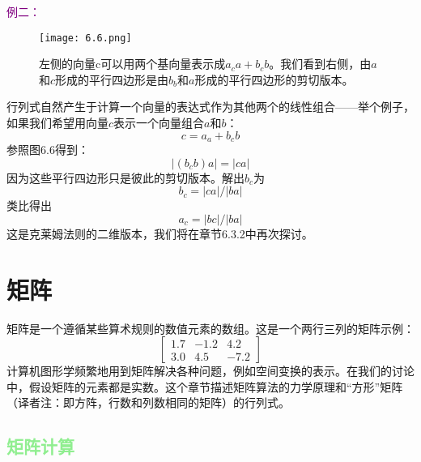 \documentclass[lang=cn,12pt,marginpar=margintrue]{elegantbook}
\begin{document}
\textcolor{purple}{例二：}

\begin{figure}[htbp]
  \centering
  \texttt{[image: 6.6.png]}
  \caption{左侧的向量c可以用两个基向量表示成$a_ca+b_cb$。我们看到右侧，由$a$和$c$形成的平行四边形是由$b_b$和$a$形成的平行四边形的剪切版本。}
\end{figure}

行列式自然产生于计算一个向量的表达式作为其他两个的线性组合——举个例子，如果我们希望用向量$c$表示一个向量组合$a$和$b$：
\[
  c = a_a + b_cb
\]
参照图6.6得到：
\[
  |(b_cb)a| = |ca|
\]
因为这些平行四边形只是彼此的剪切版本。解出$b_c$为
\[
  b_c = |ca|/|ba|
\]
类比得出
\[
  a_c = |bc|/|ba|
\]
这是克莱姆法则的二维版本，我们将在章节6.3.2中再次探讨。

\section{矩阵}

矩阵是一个遵循某些算术规则的数值元素的数组。这是一个两行三列的矩阵示例：
\[
  \left[\begin{array}{rrr}
      1.7 & -1.2 & 4.2  \\
      3.0 & 4.5  & -7.2
    \end{array}\right]
\]
计算机图形学频繁地用到矩阵解决各种问题，例如空间变换的表示。在我们的讨论中，假设矩阵的元素都是实数。这个章节描述矩阵算法的力学原理和“方形”矩阵（译者注：即方阵，行数和列数相同的矩阵）的行列式。

\subsection{\textcolor{lightgreen}{矩阵计算}}
\end{document}
